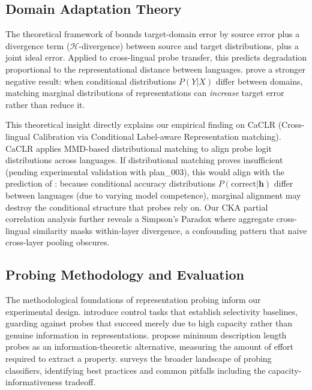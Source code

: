 \subsection{Domain Adaptation Theory}

The theoretical framework of \citet{bendavid2010theory} bounds target-domain error by source error plus a divergence term ($\mathcal{H}$-divergence) between source and target distributions, plus a joint ideal error. Applied to cross-lingual probe transfer, this predicts degradation proportional to the representational distance between languages. \citet{zhao2019invariant} prove a stronger negative result: when conditional distributions $P(Y|X)$ differ between domains, matching marginal distributions of representations can \emph{increase} target error rather than reduce it.

This theoretical insight directly explains our empirical finding on CaCLR (Cross-lingual Calibration via Conditional Label-aware Representation matching). CaCLR applies MMD-based distributional matching to align probe logit distributions across languages. If distributional matching proves insufficient (pending experimental validation with plan\_003), this would align with the prediction of \citet{zhao2019invariant}: because conditional accuracy distributions $P(\text{correct}|\mathbf{h})$ differ between languages (due to varying model competence), marginal alignment may destroy the conditional structure that probes rely on. Our CKA partial correlation analysis further reveals a Simpson's Paradox where aggregate cross-lingual similarity masks within-layer divergence, a confounding pattern that naive cross-layer pooling obscures.

\subsection{Probing Methodology and Evaluation}

The methodological foundations of representation probing inform our experimental design. \citet{hewitt2019control} introduce control tasks that establish selectivity baselines, guarding against probes that succeed merely due to high capacity rather than genuine information in representations. \citet{voita2020mdl} propose minimum description length probes as an information-theoretic alternative, measuring the amount of effort required to extract a property. \citet{belinkov2022probing} surveys the broader landscape of probing classifiers, identifying best practices and common pitfalls including the capacity-informativeness tradeoff.

